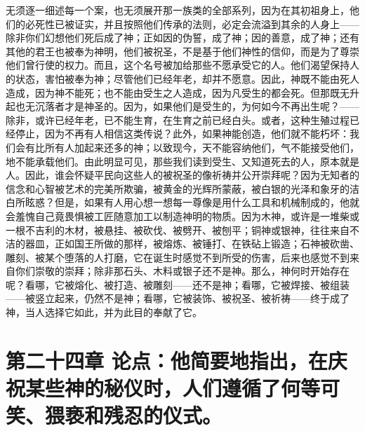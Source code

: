 
无须逐一细述每一个案，也无须展开那一族类的全部系列，因为在其初祖身上，他们的必死性已被证实，并且按照他们传承的法则，必定会流溢到其余的人身上——除非你们幻想他们死后成了神；正如因的伪誓，成了神；因的善意，成了神；还有其他的君王也被奉为神明，他们被祝圣，不是基于他们神性的信仰，而是为了尊崇他们曾行使的权力。而且，这个名号被加给那些不愿承受它的人。他们渴望保持人的状态，害怕被奉为神；尽管他们已经年老，却并不愿意。因此，神既不能由死人造成，因为神不能死；也不能由受生之人造成，因为凡受生的都会死。但那既无升起也无沉落者才是神圣的。因为，如果他们是受生的，为何如今不再出生呢？——除非，或许已经年老，已不能生育，在生育之前已经白头。或者，这种生殖过程已经停止，因为不再有人相信这类传说？此外，如果神能创造，他们就不能朽坏：我们会有比所有人加起来还多的神；以致现今，天不能容纳他们，气不能接受他们，地不能承载他们。由此明显可见，那些我们读到受生、又知道死去的人，原本就是人。因此，谁会怀疑平民向这些人的被祝圣的像祈祷并公开崇拜呢？因为无知者的信念和心智被艺术的完美所欺骗，被黄金的光辉所蒙蔽，被白银的光泽和象牙的洁白所眩惑？但是，如果有人用心想一想每一尊像是用什么工具和机械制成的，他就会羞愧自己竟畏惧被工匠随意加工以制造神明的物质。因为木神，或许是一堆柴或一根不吉利的木材，被悬挂、被砍伐、被劈开、被刨平；铜神或银神，往往来自不洁的器皿，正如国王所做的那样，被熔炼、被锤打、在铁砧上锻造；石神被砍凿、雕刻、被某个堕落的人打磨，它在诞生时感觉不到所受的伤害，后来也感觉不到来自你们崇敬的崇拜；除非那石头、木料或银子还不是神。那么，神何时开始存在呢？看哪，它被熔化、被打造、被雕刻——还不是神；看哪，它被焊接、被组装——被竖立起来，仍然不是神；看哪，它被装饰、被祝圣、被祈祷——终于成了神，当人选择它如此，并为此目的奉献了它。\par


\section{第二十四章 论点：他简要地指出，在庆祝某些神的秘仪时，人们遵循了何等可笑、猥亵和残忍的仪式。}


